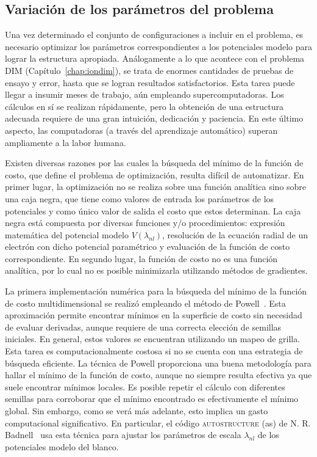 \subsection{Variación de los parámetros del problema}
\label{sec:powell}

Una vez determinado el conjunto de configuraciones a incluir en el 
problema, es necesario optimizar los parámetros correspondientes a los 
potenciales modelo para lograr la estructura apropiada. Análogamente a 
lo que acontece con el problema DIM (Capítulo~\ref{chap:iondim}), se 
trata de enormes cantidades de pruebas de ensayo y error, hasta que se 
logran resultados satisfactorios. Esta tarea puede llegar a insumir 
meses de trabajo, aún empleando supercomputadoras. Los cálculos en sí se 
realizan rápidamente, pero la obtención de una estructura adecuada 
requiere de una gran intuición, dedicación y paciencia. En este último 
aspecto, las computadoras (a través del aprendizaje automático) superan 
ampliamente a la labor humana.

Existen diversas razones por las cuales la búsqueda del mínimo de la 
función de costo, que define el problema de optimización, resulta 
difícil de automatizar. En primer lugar, la optimización no se realiza 
sobre una función analítica sino sobre una caja negra, que tiene como 
valores de entrada los parámetros de los potenciales y como 
único valor de salida el costo que estos determinan. La caja negra está 
compuesta por diversas funciones y/o procedimientos: expresión 
matemática del potencial modelo $V(\lambda_{nl})$, resolución de la 
ecuación radial de un electrón con dicho potencial paramétrico y 
evaluación de la función de costo correspondiente. En segundo lugar, la 
función de costo no es una función analítica, por lo cual no es posible 
minimizarla utilizando métodos de gradientes. 

La primera implementación numérica para la búsqueda del mínimo de la 
función de costo multidimensional se realizó empleando el método de 
Powell~\cite{Powell:64,NumRec:07}. Esta aproximación permite encontrar 
mínimos en la superficie de costo sin necesidad de evaluar derivadas, 
aunque requiere de una correcta elección de semillas iniciales. 
En general, estos valores se encuentran utilizando un mapeo de grilla.
Esta tarea es computacionalmente costosa si no se cuenta con una 
estrategia de búsqueda eficiente. La técnica de Powell proporciona una 
buena metodología para hallar el mínimo de la función de costo, aunque 
no siempre resulta efectiva ya que suele encontrar mínimos locales. Es posible 
repetir el cálculo con diferentes semillas para corroborar que el mínimo 
encontrado es efectivamente el mínimo global. Sin embargo, como se verá 
más adelante, esto implica un gasto computacional significativo. En 
particular, el código \textsc{autostructure} (\acs{as}) de N. R. 
Badnell~\cite{Badnell:11} usa esta técnica para ajustar los parámetros 
de escala $\lambda_{nl}$ de los potenciales modelo del blanco. 

